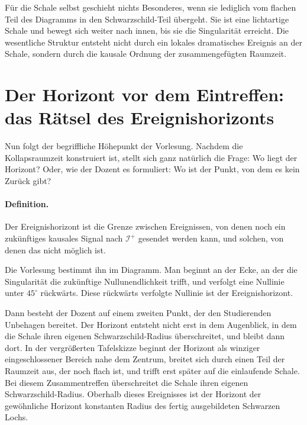 Für die Schale selbst geschieht nichts Besonderes, wenn sie lediglich vom flachen Teil des Diagramms in den Schwarzschild-Teil übergeht. Sie ist eine lichtartige Schale und bewegt sich weiter nach innen, bis sie die Singularität erreicht. Die wesentliche Struktur entsteht nicht durch ein lokales dramatisches Ereignis an der Schale, sondern durch die kausale Ordnung der zusammengefügten Raumzeit.

\begin{classroomqa}\end{classroomqa}

\section{Der Horizont vor dem Eintreffen: das Rätsel des Ereignishorizonts}

Nun folgt der begriffliche Höhepunkt der Vorlesung. Nachdem die Kollapsraumzeit konstruiert ist, stellt sich ganz natürlich die Frage: Wo liegt der Horizont? Oder, wie der Dozent es formuliert: Wo ist der Punkt, von dem es kein Zurück gibt?

\paragraph{Definition.} Der Ereignishorizont ist die Grenze zwischen Ereignissen, von denen noch ein zukünftiges kausales Signal nach \(\mathcal{I}^+\) gesendet werden kann, und solchen, von denen das nicht möglich ist.

Die Vorlesung bestimmt ihn im Diagramm. Man beginnt an der Ecke, an der die Singularität die zukünftige Nullunendlichkeit trifft, und verfolgt eine Nullinie unter \(45^\circ\) rückwärts. Diese rückwärts verfolgte Nullinie ist der Ereignishorizont.

Dann besteht der Dozent auf einem zweiten Punkt, der den Studierenden Unbehagen bereitet. Der Horizont entsteht nicht erst in dem Augenblick, in dem die Schale ihren eigenen Schwarzschild-Radius überschreitet, und bleibt dann dort. In der vergrößerten Tafelskizze beginnt der Horizont als winziger eingeschlossener Bereich nahe dem Zentrum, breitet sich durch einen Teil der Raumzeit aus, der noch flach ist, und trifft erst später auf die einlaufende Schale. Bei diesem Zusammentreffen überschreitet die Schale ihren eigenen Schwarzschild-Radius. Oberhalb dieses Ereignisses ist der Horizont der gewöhnliche Horizont konstanten Radius des fertig ausgebildeten Schwarzen Lochs.


